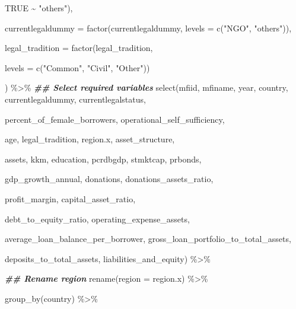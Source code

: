 \documentclass[a4paper,nobind]{templates/ociamthesis}
\newenvironment{Shaded}{\begin{snugshade}}{\end{snugshade}}
\newcommand{\AttributeTok}[1]{\textcolor[rgb]{0.77,0.63,0.00}{#1}}
\newcommand{\ConstantTok}[1]{\textcolor[rgb]{0.00,0.00,0.00}{#1}}
\newcommand{\DocumentationTok}[1]{\textcolor[rgb]{0.56,0.35,0.01}{\textbf{\textit{#1}}}}
\newcommand{\FunctionTok}[1]{\textcolor[rgb]{0.00,0.00,0.00}{#1}}
\newcommand{\NormalTok}[1]{#1}
\newcommand{\SpecialCharTok}[1]{\textcolor[rgb]{0.00,0.00,0.00}{#1}}
\newcommand{\StringTok}[1]{\textcolor[rgb]{0.31,0.60,0.02}{#1}}
\renewenvironment{Shaded}
{
  \vspace{10pt}%
  \begin{snugshade}%
}{%
  \end{snugshade}%
  \vspace{8pt}%
}
\begin{document}
\begin{Shaded}
\begin{Highlighting}[]
                                           \ConstantTok{TRUE} \SpecialCharTok{\textasciitilde{}} \StringTok{"others"}\NormalTok{),}
      
        \AttributeTok{currentlegaldummy =} \FunctionTok{factor}\NormalTok{(currentlegaldummy, }\AttributeTok{levels =} \FunctionTok{c}\NormalTok{(}\StringTok{"NGO"}\NormalTok{, }\StringTok{"others"}\NormalTok{)),}
        
        \AttributeTok{legal\_tradition =} \FunctionTok{factor}\NormalTok{(legal\_tradition, }
                                 
                                 \AttributeTok{levels =} \FunctionTok{c}\NormalTok{(}\StringTok{"Common"}\NormalTok{, }\StringTok{"Civil"}\NormalTok{, }\StringTok{"Other"}\NormalTok{))}
        
\NormalTok{        ) }\SpecialCharTok{\%\textgreater{}\%} 
  \DocumentationTok{\#\# Select required variables }
  \FunctionTok{select}\NormalTok{(mfiid, mfiname, year, country, currentlegaldummy, currentlegalstatus, }
         
\NormalTok{         percent\_of\_female\_borrowers, operational\_self\_sufficiency,}
         
\NormalTok{         age, legal\_tradition, region.x, asset\_structure, }
         
\NormalTok{         assets, kkm, education, pcrdbgdp, stmktcap, prbonds, }
         
\NormalTok{         gdp\_growth\_annual, donations, donations\_assets\_ratio, }
         
\NormalTok{         profit\_margin, capital\_asset\_ratio,}
         
\NormalTok{         debt\_to\_equity\_ratio, operating\_expense\_assets, }
         
\NormalTok{         average\_loan\_balance\_per\_borrower, gross\_loan\_portfolio\_to\_total\_assets, }
         
\NormalTok{         deposits\_to\_total\_assets, liabilities\_and\_equity) }\SpecialCharTok{\%\textgreater{}\%} 
  
          \DocumentationTok{\#\# Rename region}
         \FunctionTok{rename}\NormalTok{(}\AttributeTok{region =}\NormalTok{ region.x) }\SpecialCharTok{\%\textgreater{}\%} 
  
  \FunctionTok{group\_by}\NormalTok{(country) }\SpecialCharTok{\%\textgreater{}\%} 
  

\end{Highlighting}
\end{Shaded}
\end{document}
